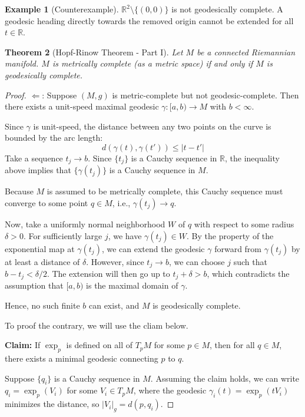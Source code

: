 \documentclass[11pt, a4paper]{article}
\theoremstyle{plain}
\newtheorem{theorem}{Theorem}[section]
\theoremstyle{definition}
\newtheorem{example}[theorem]{Example}
\theoremstyle{remark}
\begin{document}
{\begin{example}[Counterexample]
$\mathbb{R}^2 \setminus \{(0,0)\}$ is not geodesically complete. A geodesic heading directly towards the removed origin cannot be extended for all $t \in \mathbb{R}$.
\end{example}

\begin{theorem}[Hopf-Rinow Theorem - Part I]
Let $M$ be a connected Riemannian manifold. $M$ is metrically complete (as a metric space) if and only if $M$ is geodesically complete.
\end{theorem}

\begin{proof}
$\Leftarrow$: Suppose $(M,g)$ is metric-complete but not geodesic-complete. Then there exists a unit-speed maximal geodesic $\gamma:[a,b) \to M$ with $b < \infty$.

Since $\gamma$ is unit-speed, the distance between any two points on the curve is bounded by the arc length:
\[ d(\gamma(t), \gamma(t')) \le |t - t'| \]
Take a sequence $t_j \to b$. Since $\{t_j\}$ is a Cauchy sequence in $\mathbb{R}$, the inequality above implies that $\{\gamma(t_j)\}$ is a Cauchy sequence in $M$. 

Because $M$ is assumed to be metrically complete, this Cauchy sequence must converge to some point $q \in M$, i.e., $\gamma(t_j) \to q$.

Now, take a uniformly normal neighborhood $W$ of $q$ with respect to some radius $\delta > 0$. For sufficiently large $j$, we have $\gamma(t_j) \in W$. By the property of the exponential map at $\gamma(t_j)$, we can extend the geodesic $\gamma$ forward from $\gamma(t_j)$ by at least a distance of $\delta$. However, since $t_j \to b$, we can choose $j$ such that $b - t_j < \delta/2$. The extension will then go up to $t_j + \delta > b$, which contradicts the assumption that $[a, b)$ is the maximal domain of $\gamma$. 

Hence, no such finite $b$ can exist, and $M$ is geodesically complete.

To proof the contrary, we will use the cliam below.

\noindent\textbf{Claim:}
If $\exp_p$ is defined on all of $T_pM$ for some $p \in M$, then for all $q \in M$, there exists a minimal geodesic connecting $p$ to $q$.

Suppose $\{q_i\}$ is a Cauchy sequence in $M$. Assuming the claim holds, we can write $q_i = \exp_p(V_i)$ for some $V_i \in T_pM$, where the geodesic $\gamma_i(t) = \exp_p(t V_i)$ minimizes the distance, so $|V_i|_{g} = d(p, q_i)$.


\end{proof}}
\end{document}
